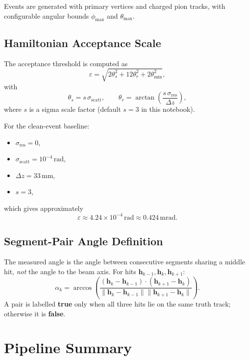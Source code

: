 \documentclass[11pt,a4paper]{article}
\begin{document}
Events are generated with primary vertices and charged pion tracks, with
configurable angular bounds $\phi_{\max}$ and $\theta_{\max}$.

\subsection{Hamiltonian Acceptance Scale}
The acceptance threshold is computed as
\begin{equation}
\varepsilon = \sqrt{2\theta_s^2 + 12\theta_r^2 + 2\theta_{\min}^2},
\end{equation}
with
\begin{equation}
\theta_s = s\,\sigma_{\mathrm{scatt}},
\qquad
\theta_r = \arctan\!\left(\frac{s\,\sigma_{\mathrm{res}}}{\Delta z}\right),
\end{equation}
where $s$ is a sigma scale factor (default $s=3$ in this notebook).

For the clean-event baseline:
\begin{itemize}[leftmargin=1.5em]
  \item $\sigma_{\mathrm{res}}=0$,
  \item $\sigma_{\mathrm{scatt}}=10^{-4}\,\mathrm{rad}$,
  \item $\Delta z=33\,\mathrm{mm}$,
  \item $s=3$,
\end{itemize}
which gives approximately
\begin{equation}
\varepsilon \approx 4.24\times 10^{-4}\,\mathrm{rad}
\approx 0.424\,\mathrm{mrad}.
\end{equation}

\subsection{Segment-Pair Angle Definition}
The measured angle is the angle between consecutive segments sharing a middle
hit, \emph{not} the angle to the beam axis. For hits
$\mathbf{h}_{k-1},\mathbf{h}_k,\mathbf{h}_{k+1}$:
\begin{equation}
\alpha_k = \arccos\!\left(
\frac{(\mathbf{h}_{k}-\mathbf{h}_{k-1})\cdot(\mathbf{h}_{k+1}-\mathbf{h}_{k})}
{\lVert \mathbf{h}_{k}-\mathbf{h}_{k-1} \rVert
 \lVert \mathbf{h}_{k+1}-\mathbf{h}_{k} \rVert}
\right).
\end{equation}
A pair is labelled \textbf{true} only when all three hits lie on the same truth
track; otherwise it is \textbf{false}.

\section{Pipeline Summary}
\end{document}
